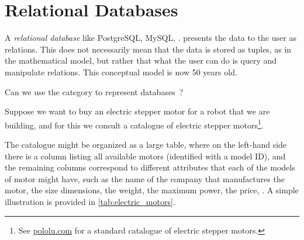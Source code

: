 

\section{Relational Databases}
\label{sec:relational-databases}


A \emph{relational database} like PostgreSQL, MySQL, \etc. presents
the data to the user as relations. This does not necessarily mean
that the data is stored as tuples, as in the mathematical model, but
rather that what the user can do is query and manipulate relations.
This conceptual model is now 50 years old.

Can we use the category \Rel to represent databases~\cite{codd2002relational}?

Suppose we want to buy an electric stepper motor for a robot that we are building, and for this we consult a catalogue of electric stepper motors\footnote{See \href{https://www.pololu.com/category/87/stepper-motors}{pololu.com} for a standard catalogue of electric stepper motors.}.

The catalogue might be organized as a large table, where on the left-hand side there is a column listing all available motors (identified with a model ID), and the remaining columns correspond to different attributes that each of the models of motor might have, such as the name of the company that manufactures the motor, the size dimensions, the weight, the maximum power, the price, \etc. A simple illustration is provided in \cref{tab:electric_motors}.

\begin{table}[h]
  \centering
  \caption{A simplified catalogue of motors.}
  \label{tab:electric_motors}
\end{table}


